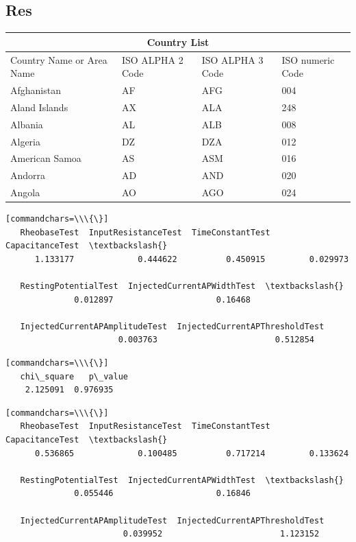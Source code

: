 
\subsection{Res}


\setlength{\arrayrulewidth}{1mm}
\setlength{\tabcolsep}{18pt}
\renewcommand{\arraystretch}{2.5}

\begin{tabular}{ |p{3cm}||p{3cm}|p{3cm}|p{3cm}|  }
 \hline
 \multicolumn{4}{|c|}{Country List} \\
 \hline
 Country Name     or Area Name& ISO ALPHA 2 Code &ISO ALPHA 3 Code&ISO numeric Code\\
 \hline
 Afghanistan   & AF    &AFG&   004\\
 Aland Islands&   AX  & ALA   &248\\
 Albania &AL & ALB&  008\\
 Algeria    &DZ & DZA&  012\\
 American Samoa&   AS  & ASM&016\\
 Andorra& AD  & AND   &020\\
 Angola& AO  & AGO&024\\
 \hline
\end{tabular}

\begin{verbatim}[commandchars=\\\{\}]
   RheobaseTest  InputResistanceTest  TimeConstantTest  CapacitanceTest  \textbackslash{}
      1.133177             0.444622          0.450915         0.029973

   RestingPotentialTest  InjectedCurrentAPWidthTest  \textbackslash{}
              0.012897                     0.16468

   InjectedCurrentAPAmplitudeTest  InjectedCurrentAPThresholdTest
                       0.003763                        0.512854
\end{verbatim}

\begin{verbatim}[commandchars=\\\{\}]
   chi\_square   p\_value
    2.125091  0.976935
\end{verbatim}

\begin{verbatim}[commandchars=\\\{\}]
   RheobaseTest  InputResistanceTest  TimeConstantTest  CapacitanceTest  \textbackslash{}
      0.536865             0.100485          0.717214         0.133624

   RestingPotentialTest  InjectedCurrentAPWidthTest  \textbackslash{}
              0.055446                     0.16846

   InjectedCurrentAPAmplitudeTest  InjectedCurrentAPThresholdTest
                        0.039952                        1.123152
\end{verbatim}

